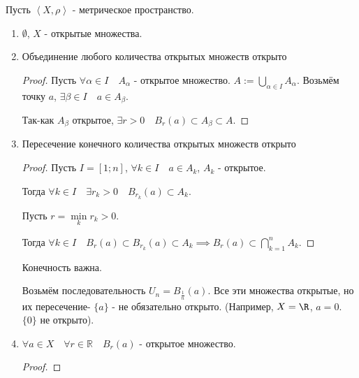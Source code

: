 \begin{properties} \thmslashn

    Пусть $\left<X, \rho\right>$ - метрическое пространство.
    \begin{enumerate}
        \item $ \emptyset$, $X$ - открытые множества.
        \item Объединение любого количества открытых множеств открыто
            \begin{proof} \thmslashn
            
                Пусть $\forall{\alpha\in I}\quad A_{\alpha}$ - открытое множество. $A := \bigcup\limits_{\alpha\in I} A_{\alpha}$.
               Возьмём точку $a$,  $\exists{\beta\in I}\quad a\in A_{\beta}$.

               Так-как $A_{\beta}$ открытое, $\exists{r > 0}\quad B_{r}(a) \subset A_{\beta} \subset A$. 
            \end{proof}
        \item Пересечение конечного количества открытых множеств открыто
            \begin{proof} \thmslashn
            
                Пусть $I = [1; n]$, $\forall{k\in I}\quad a\in A_{k}$, $A_{k}$ - открытое.

                Тогда $\forall{k\in I}\quad \exists{r_{k} > 0}\quad B_{r_{k}}(a) \subset A_{k}$.

                Пусть $r = \min\limits_{k} r_{k} > 0$.

                Тогда $\forall{k\in I}\quad B_{r}(a) \subset B_{r_{k}}(a) \subset A_{k} \implies B_{r}(a) \subset \bigcap\limits_{k=1}^{n} A_{k}$.
            \end{proof}
            \begin{remark} \thmslashn
            
                Конечность важна.

                Возьмём последовательность $U_{n} = B_{\frac{1}{n}}(a)$. Все эти множества открытые, но их пересечение- $\{a\}$ - не обязательно открыто. (Например, $X=\R$, $a=0$. $\{0\}$ не открыто).
            
            \end{remark}
        \item $\forall{a\in X}\quad \forall{r\in \mathbb{R}}\quad B_{r}(a)$ - открытое множество.
            \begin{proof} \thmslashn
                


\end{proof}
\end{enumerate}
\end{properties}
